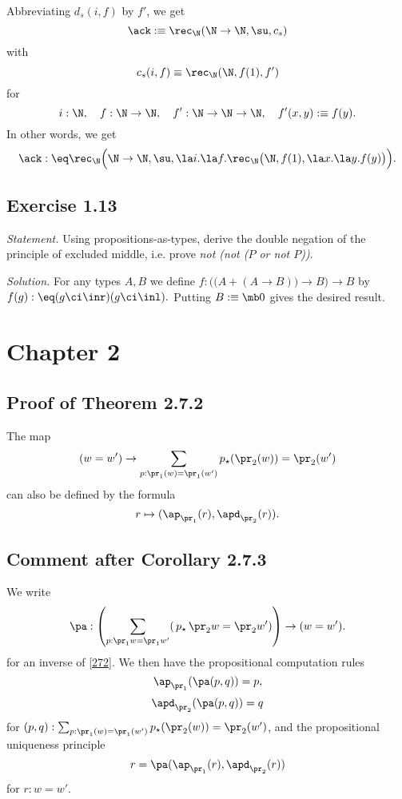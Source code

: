 \documentclass[12pt]{article}
\begin{document}
Abbreviating $d_s(i,f)$ by $f'$, we get 
$$
\ack:\equiv\rec_\N(\N\to\N,\su,c_s)
$$ 
with 
$$ 
c_s(i,f)\equiv\rec_\N(\N,f(1),f')
$$ 
for 
$$ 
i:\N,\quad f:\N\to\N,\quad f':\N\to\N\to\N,\quad f'(x,y):\equiv f(y).
$$ 
In other words, we get 
$$
\ack:\eq\rec_\N\Big(\N\to\N,\su,\la i.\la f.\rec_\N\big(\N,f(1),\la x.\la y.f(y)\big)\Big).
$$


\subsection{Exercise 1.13}

\emph{Statement.} Using propositions-as-types, derive the double negation of the principle of excluded middle, i.e. prove \emph{not (not ($P$ or not $P$))}.

\nn\emph{Solution.} For any types $A,B$ we define $f:\Big(\big(A+(A\to B)\big)\to B\Big)\to B$ by $f(g):\eq(g\ci\inr)(g\ci\inl).$ Putting $B:\equiv\mb0$ gives the desired result.


\section{Chapter 2}

\subsection{Proof of Theorem 2.7.2}

The map 
\begin{equation}\label{272}
(w=w')\to\sum_{p:\pr_1(w)=\pr_1(w')}p_\star(\pr_2(w))=\pr_2(w')
\end{equation}
can also be defined by the formula 
$$
r\mapsto(\ap_{\pr_1}(r),\apd_{\pr_2}(r)).
$$ 


\subsection{Comment after Corollary 2.7.3}

We write 
$$
\pa:\left(\sum_{p:\pr_1w=\pr_1w'}(\,p_\star\,\pr_2w=\pr_2w')\right)\to(w=w').
$$ 
for an inverse of \eqref{272}. We then have the propositional computation rules 
$$
\ap_{\pr_1}(\pa(p,q))=p,
$$
$$
\apd_{\pr_2}(\pa(p,q))=q
$$
for $(p,q):\sum_{p:\pr_1(w)=\pr_1(w')}p_\star(\pr_2(w))=\pr_2(w')$, and the propositional uniqueness principle 
$$
r=\pa(\ap_{\pr_1}(r),\apd_{\pr_2}(r))
$$ 
for $r:w=w'$.
\end{document}
